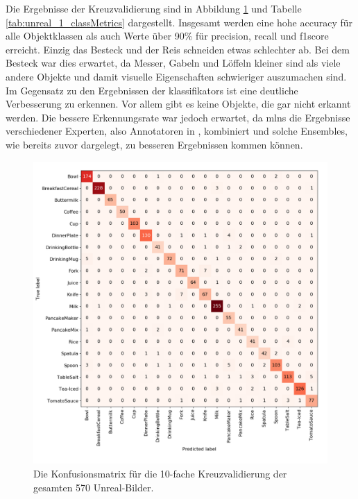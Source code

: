 Die Ergebnisse der Kreuzvalidierung sind in Abbildung \ref{fig:unreal_1_confMatrix} und Tabelle \ref{tab:unreal_1_classMetrics} dargestellt. Insgesamt werden eine hohe \gls{accuracy} für alle Objektklassen als auch Werte über 90\% für \gls{precision}, \gls{recall} und \gls{f1score} erreicht. Einzig das Besteck und der Reis schneiden etwas schlechter ab. Bei dem Besteck war dies erwartet, da Messer, Gabeln und Löffeln kleiner sind als viele andere Objekte und damit visuelle Eigenschaften schwieriger auszumachen sind. Im Gegensatz zu den Ergebnissen der \glspl{klassifikator} ist eine deutliche Verbesserung zu erkennen. Vor allem gibt es keine Objekte, die gar nicht erkannt werden. Die bessere Erkennungsrate war jedoch erwartet, da \glspl{mln} die Ergebnisse verschiedener Experten, also Annotatoren in \robosherlock, kombiniert und solche Ensembles, wie bereits zuvor dargelegt, zu besseren Ergebnissen kommen können.     

\begin{figure}
	\includegraphics[scale=.5]{img/chapter6/unrealEx1_cof_matrix.png}
\caption[Konfusionsmatrix des gesamten Unreal-Bilder Datensatzes]{Die Konfusionsmatrix für die 10-fache Kreuzvalidierung der gesamten 570 Unreal-Bilder.}
\label{fig:unreal_1_confMatrix}
\end{figure}

